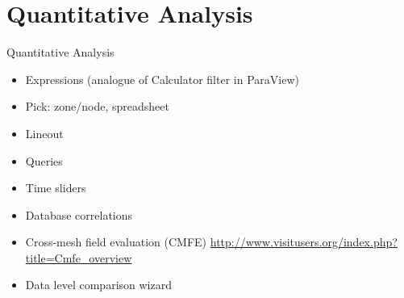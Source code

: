 \section{Quantitative Analysis}
\begin{frame}{Quantitative Analysis}{}
  \begin{itemize}
  \item Expressions (analogue of Calculator filter in ParaView)
  \item Pick: zone/node, spreadsheet
  \item Lineout
  \item Queries
  \item Time sliders
  \item Database correlations
  \item Cross-mesh field evaluation (CMFE)
    \url{http://www.visitusers.org/index.php?title=Cmfe_overview}
  \item Data level comparison wizard
  \end{itemize}
\end{frame}
